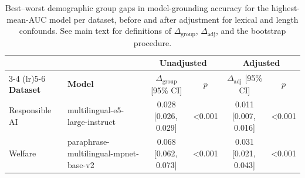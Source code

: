 \begin{table}[t]
\centering
\small
\setlength{\tabcolsep}{4pt}
\caption{Best--worst demographic group gaps in model-grounding accuracy for the highest-mean-AUC model per dataset, before and after adjustment for lexical and length confounds. See main text for definitions of $\Delta_{\mathrm{group}}$, $\Delta_{\mathrm{adj}}$, and the bootstrap procedure.}
\label{tab:group-gap-controlled}
\begin{tabular}{llcccc}
\toprule
 & & \multicolumn{2}{c}{\textbf{Unadjusted}} & \multicolumn{2}{c}{\textbf{Adjusted}} \\
\cmidrule(lr){3-4} \cmidrule(lr){5-6}
\textbf{Dataset} & \textbf{Model} & $\Delta_{\mathrm{group}}$ [95\% CI] & $p$ & $\Delta_{\mathrm{adj}}$ [95\% CI] & $p$ \\
\midrule
Responsible AI & multilingual-e5-large-instruct & 0.028 [0.026,\,0.029] & <0.001 & 0.011 [0.007,\,0.016] & <0.001 \\
Welfare & paraphrase-multilingual-mpnet-base-v2 & 0.068 [0.062,\,0.073] & <0.001 & 0.031 [0.021,\,0.043] & <0.001 \\
\bottomrule
\end{tabular}
\end{table}
